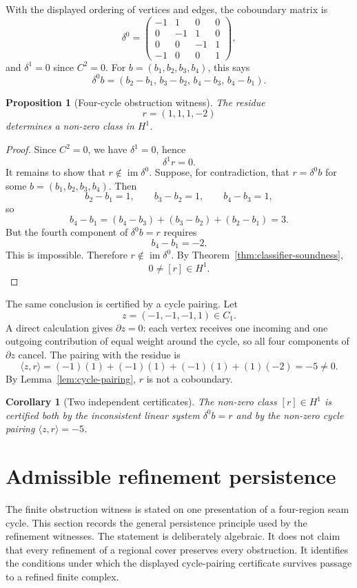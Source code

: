 \documentclass[11pt]{article}
\newtheorem{proposition}[theorem]{Proposition}
\newtheorem{corollary}[theorem]{Corollary}
\newcommand{\im}{\operatorname{im}}
\begin{document}
With the displayed ordering of vertices and edges, the coboundary matrix is
\[
\delta^0=
\begin{pmatrix}
-1&1&0&0\\
0&-1&1&0\\
0&0&-1&1\\
-1&0&0&1
\end{pmatrix},
\]
and \(\delta^1=0\) since \(C^2=0\). For \(b=(b_1,b_2,b_3,b_4)\), this says
\[
\delta^0b=(b_2-b_1,\,b_3-b_2,\,b_4-b_3,\,b_4-b_1).
\]

\begin{proposition}[Four-cycle obstruction witness]\label{prop:nonremovable}
The residue
\[
r=(1,1,1,-2)
\]
determines a non-zero class in \(H^1\).
\end{proposition}

\begin{proof}
Since \(C^2=0\), we have \(\delta^1=0\), hence
\[
\delta^1r=0.
\]
It remains to show that \(r\notin \im\delta^0\). Suppose, for contradiction, that \(r=\delta^0b\) for some \(b=(b_1,b_2,b_3,b_4)\). Then
\[
b_2-b_1=1,
\qquad
b_3-b_2=1,
\qquad
b_4-b_3=1,
\]
so
\[
b_4-b_1
=(b_4-b_3)+(b_3-b_2)+(b_2-b_1)
=3.
\]
But the fourth component of \(\delta^0b=r\) requires
\[
b_4-b_1=-2.
\]
This is impossible. Therefore \(r\notin \im\delta^0\). By Theorem~\ref{thm:classifier-soundness},
\[
0\neq [r]\in H^1.
\]
\end{proof}

The same conclusion is certified by a cycle pairing. Let
\[
z=(-1,-1,-1,1)\in C_1.
\]
A direct calculation gives \(\partial z=0\): each vertex receives one incoming and one outgoing contribution of equal weight around the cycle, so all four components of \(\partial z\) cancel. The pairing with the residue is
\[
\langle z,r\rangle
=(-1)(1)+(-1)(1)+(-1)(1)+(1)(-2)
=-5\neq 0.
\]
By Lemma~\ref{lem:cycle-pairing}, \(r\) is not a coboundary.

\begin{corollary}[Two independent certificates]
The non-zero class \([r]\in H^1\) is certified both by the inconsistent linear system \(\delta^0b=r\) and by the non-zero cycle pairing \(\langle z,r\rangle=-5\).
\end{corollary}


\section{Admissible refinement persistence}
\label{sec:admissible-refinement}

The finite obstruction witness is stated on one presentation of a four-region seam cycle. This section records the general persistence principle used by the refinement witnesses. The statement is deliberately algebraic. It does not claim that every refinement of a regional cover preserves every obstruction. It identifies the conditions under which the displayed cycle-pairing certificate survives passage to a refined finite complex.
\end{document}
